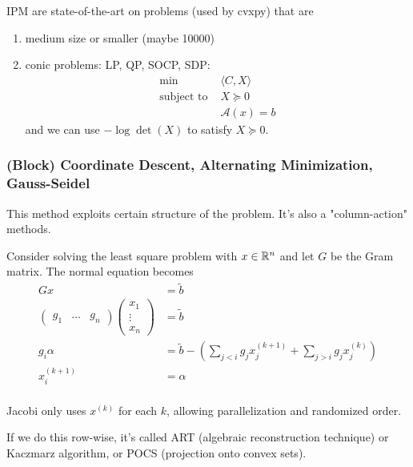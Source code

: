 \documentclass[class=article,crop=false]{standalone}
\begin{document}
\begin{remark}
	IPM are state-of-the-art on problems (used by cvxpy) that are
\begin{enumerate}[label=(\arabic*)]
	\item medium size or smaller (maybe 10000)
	\item conic problems: LP, QP, SOCP, SDP:
		\begin{align*}
		\min\quad & \langle C,X \rangle \\
		\text{subject to } &X \succeq 0 \\
			  & \mathcal{ A}(x) =b
		\end{align*}
		and we can use $ -\log \det(X)$ to satisfy $ X \succeq 0$.
\end{enumerate}
\end{remark}

\subsubsection{(Block) Coordinate Descent, Alternating Minimization, Gauss-Seidel}
This method exploits certain structure of the problem. It's also a "column-action" methods.
\begin{eg}
Consider solving the least square problem with $ x \in \mathbb{R}^{n}$ and let $ G$ be the Gram matrix. The normal equation becomes
\begin{align*}
	Gx &= \widetilde{ b}\\
	\begin{pmatrix} g_1 & \ldots& g_n \end{pmatrix} \begin{pmatrix} x_1\\ \vdots\\ x_n \end{pmatrix} &= \widetilde{ b} \\
	g_i \alpha &= \widetilde{ b} - \left( \sum_{j<i} g_j x_j^{(k+1)}+ \sum_{j>i} g_j x_j^{(k)} \right) \\
	x_i^{(k+1)} &= \alpha \\
\end{align*}
\end{eg}
\begin{remark}
	Jacobi only uses $ x^{(k)}$ for each $ k$, allowing parallelization and randomized order.
\end{remark}

If we do this row-wise, it's called ART (algebraic reconstruction technique) or Kaczmarz algorithm, or POCS (projection onto convex sets).
\end{document}
